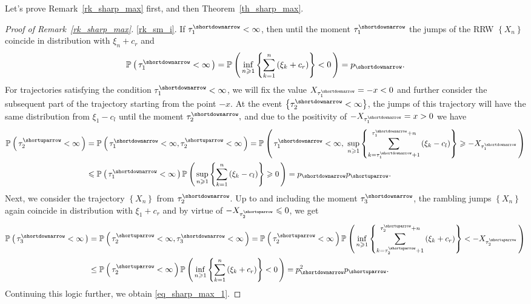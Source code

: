 \documentclass{article}
\theoremstyle{plain}
\theoremstyle{definition}
\theoremstyle{remark}
\newcommand{\p}[2][]{{\mathbb{P}}_{#1} \left( \, #2 \, \right) } %
\newcommand{\skk}[1]{\left\{ #1 \right\}} %
\begin{document}
Let's prove Remark~\ref{rk_sharp_max} first, and then Theorem~\ref{th_sharp_max}.
\begin{proof}[Proof of Remark~\ref{rk_sharp_max}]
\ref{rk_sm_i}.
If $\tau_1^{\shortdownarrow}<\infty$,  then until the moment $\tau_1^{\shortdownarrow}$ the jumps of the RRW $\left\{X_n\right\}$ coincide in distribution with $\xi_n + c_r$ and
$$ 
\p{\tau_1^{\shortdownarrow}<\infty}= \p{\inf\limits_{n \geqslant 1} \skk{\sum\limits_{k=1}^n \left(\xi_k +c_r\right)} < 0} = p_{\shortdownarrow}.
$$
For trajectories satisfying the condition $\tau_1^{\shortdownarrow}<\infty$, we will fix the value $X_{\tau_1^{\shortdownarrow}}=-x<0$ and further consider the subsequent part of the trajectory starting from the point $-x$. At the event $\left\{\tau_2^{\shortdownarrow}<\infty\right\}$, the jumps of this trajectory will have the same distribution from $\xi_1 - c_l$ until the moment $\tau_2^{\shortdownarrow},$ and due to the positivity of $ -X_{\tau_1^{\shortdownarrow}} = x > 0$ we have
\begin{equation}\label{eq_loc_new_1}
\begin{split} 
\p{ \tau_2^{\shortuparrow}<\infty } & =  \p{\tau_1^{\shortdownarrow}<\infty, \tau_2^{\shortuparrow}<\infty } = \p{\tau_1^{\shortdownarrow}<\infty,  \ \sup\limits_{n\geqslant 1} \skk{\sum\limits_{k=\tau_1^{\shortdownarrow}+1}^{\tau_1^{\shortdownarrow}+n} \left(\xi_k -c_l\right)} \geqslant -X_{\tau_1^{\shortdownarrow}} } \\
& \leqslant \p{\tau_1^{\shortdownarrow}<\infty} \p{\sup\limits_{n\geqslant 1} \skk{\sum\limits_{k=1}^n \left(\xi_k -c_l\right)} \geqslant 0} = p_{\shortdownarrow} p_{\shortuparrow} .
\end{split}
\end{equation}
Next, we consider the trajectory $\left\{X_n\right\}$ from $\tau_2^{\shortdownarrow}$. Up to and including the moment $\tau_3^{\shortdownarrow}$, the rambling jumps $\left\{X_n\right\}$ again coincide in distribution with $\xi_1 + c_r$ and by virtue of $ - X_{\tau_2^{\shortuparrow}} \leqslant 0$, we get
\begin{equation*}
\begin{split}
\p{\tau_3^{\shortdownarrow}<\infty} & = \p{\tau_2^{\shortuparrow}<\infty, \tau_3^{\shortdownarrow}<\infty}  = \p{\tau_2^{\shortuparrow}<\infty} \p{\inf\limits_{n \geqslant 1} \skk{\sum\limits_{k=\tau_2^{\shortuparrow}+1}^{\tau_2^{\shortuparrow}+n} \left(\xi_k +c_r\right)} < - X_{\tau_2^{\shortuparrow}} } \\ 
&\leq \p{\tau_2^{\shortuparrow}<\infty} \p{\inf\limits_{n \geqslant 1} \skk{\sum\limits_{k=1}^n \left(\xi_k +c_r\right)} < 0 } = p_{\shortdownarrow}^2 p_{\shortuparrow}.
\end{split}
\end{equation*}
Continuing this logic further, we obtain \eqref{eq_sharp_max_1}.



\end{proof}
\end{document}
